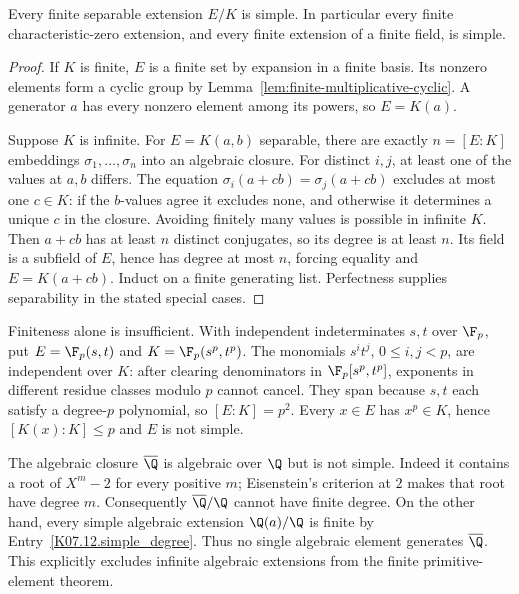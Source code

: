 \begin{theorem}
Every finite separable extension $E/K$ is simple. In particular every finite characteristic-zero extension, and every finite extension of a finite field, is simple.
\end{theorem}
\begin{proof}
If $K$ is finite, $E$ is a finite set by expansion in a finite basis. Its nonzero elements form a cyclic group by Lemma~\ref{lem:finite-multiplicative-cyclic}. A generator $a$ has every nonzero element among its powers, so $E=K(a)$.

Suppose $K$ is infinite. For $E=K(a,b)$ separable, there are exactly $n=[E:K]$ embeddings $\sigma_1,\ldots,\sigma_n$ into an algebraic closure. For distinct $i,j$, at least one of the values at $a,b$ differs. The equation $\sigma_i(a+cb)=\sigma_j(a+cb)$ excludes at most one $c\in K$: if the $b$-values agree it excludes none, and otherwise it determines a unique $c$ in the closure. Avoiding finitely many values is possible in infinite $K$. Then $a+cb$ has at least $n$ distinct conjugates, so its degree is at least $n$. Its field is a subfield of $E$, hence has degree at most $n$, forcing equality and $E=K(a+cb)$. Induct on a finite generating list. Perfectness supplies separability in the stated special cases.
\end{proof}
\begin{example}
Finiteness alone is insufficient. With independent indeterminates $s,t$ over $\F_p$, put $E=\F_p(s,t)$ and $K=\F_p(s^p,t^p)$. The monomials $s^i t^j$, $0\leq i,j<p$, are independent over $K$: after clearing denominators in $\F_p[s^p,t^p]$, exponents in different residue classes modulo $p$ cannot cancel. They span because $s,t$ each satisfy a degree-$p$ polynomial, so $[E:K]=p^2$. Every $x\in E$ has $x^p\in K$, hence $[K(x):K]\leq p$ and $E$ is not simple.
\end{example}

\begin{remark}
The algebraic closure $\overline{\Q}$ is algebraic over $\Q$ but is not simple. Indeed it contains a root of $X^m-2$ for every positive $m$; Eisenstein's criterion at $2$ makes that root have degree $m$. Consequently $\overline{\Q}/\Q$ cannot have finite degree. On the other hand, every simple algebraic extension $\Q(a)/\Q$ is finite by Entry~\ref{K07.12.simple_degree}. Thus no single algebraic element generates $\overline{\Q}$. This explicitly excludes infinite algebraic extensions from the finite primitive-element theorem.
\end{remark}

